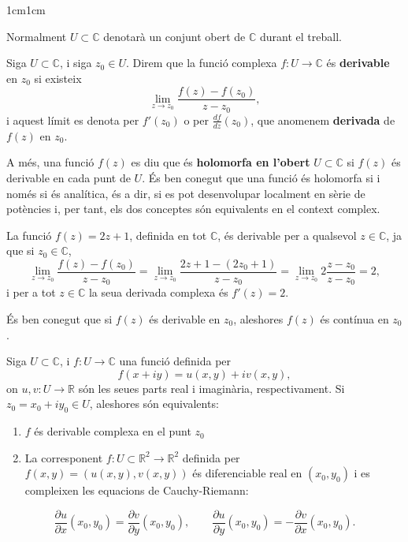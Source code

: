 \begin{adjustwidth}{1cm}{1cm}
\begin{nota}
    Normalment $U\subset \mathbb{C}$ denotarà un conjunt obert de $\mathbb{C}$ durant el treball.
\end{nota}

\begin{definicio}
    Siga $U\subset \mathbb{C}$, i siga $z_0\in U$. Direm que la funció complexa $f:U\to \mathbb{C}$ és \textbf{derivable} en $z_0$ si existeix
    \begin{equation}
        \lim_{z\to z_0} \frac{f(z)-f(z_0)}{z-z_0},
        \label{eqquodif}
    \end{equation}
    i aquest límit es denota per $f'(z_
    0)$ o per $\frac{df}{dz}(z_0)$, que anomenem \textbf{derivada} de $f(z)$ en $z_0$.

    A més, una funció $f(z)$ es diu que és \textbf{holomorfa en l'obert} $U \subset \mathbb{C}$ si $f(z)$ és derivable en cada punt de $U$. És ben conegut que una funció és holomorfa si i només si és analítica, és a dir, si es pot desenvolupar localment en sèrie de potències i, per tant, els dos conceptes són equivalents en el context complex.
\end{definicio}

\begin{exemple}
    La funció $f(z)=2z+1$, definida en tot $\mathbb{C}$, és derivable per a qualsevol $z\in \mathbb{C}$, ja que si $z_0\in \mathbb{C}$, 
    \[
        \lim_{z\to z_0} \frac{f(z)-f(z_0)}{z-z_0}= \lim_{z\to z_0} \frac{2z+1-(2z_0+1)}{z-z_0}=\lim_{z\to z_0}2\frac{z-z_0}{z-z_0}=2,
    \]
    i per a tot $z\in \mathbb{C}$ la seua derivada complexa és $f'(z)=2$.
\end{exemple}

\begin{nota}
    És ben conegut que si $f(z)$ és derivable en $z_0$, aleshores $f(z)$ és contínua en $z_0$.
\end{nota}


\begin{teorema}
    Siga $U \subset \mathbb{C}$, i $f:U \to \mathbb{C}$ una funció definida per
    \[
        f(x+iy)=u(x,y)+iv(x,y),
    \]
    on $u,v:U \to \mathbb{R}$ són les seues parts real i imaginària, respectivament. Si $z_0=x_0+iy_0\in U$, aleshores són equivalents:

    \begin{enumerate}
        \item $f$ és derivable complexa en el punt $z_0$
        \item La corresponent $f:U\subset \mathbb{R}^2\to \mathbb{R}^2$ definida per $f(x,y)=(u(x,y),v(x,y))$ és diferenciable real en $(x_0,y_0)$ i es compleixen les equacions de Cauchy-Riemann: 
    \end{enumerate}
    \[
        \frac{\partial u}{\partial x}(x_0,y_0)
        =
        \frac{\partial v}{\partial y}(x_0,y_0),
        \qquad
        \frac{\partial u}{\partial y}(x_0,y_0)
        =
        -\frac{\partial v}{\partial x}(x_0,y_0).
    \]


\end{teorema}
\end{adjustwidth}
